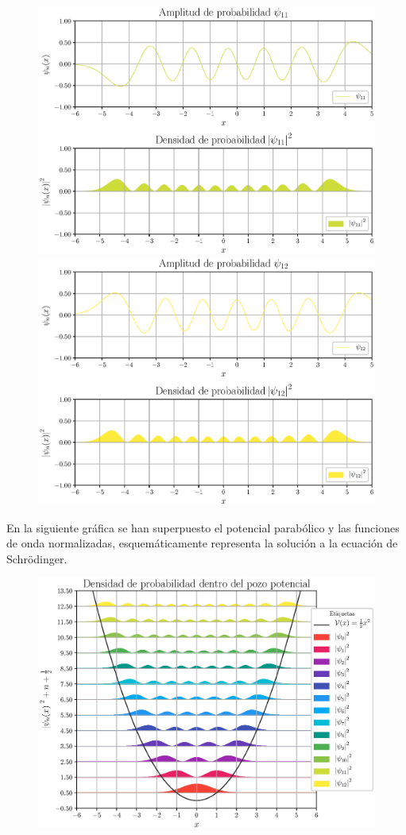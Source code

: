 \begin{figure}[H]
    \centering
    \includegraphics[scale=0.6]{Imagenes/Funcion_Onda_011.eps}
    \includegraphics[scale=0.6]{Imagenes/Funcion_Onda_012.eps}
\end{figure}
\newpage
En la siguiente gráfica se han superpuesto el potencial parabólico y las funciones de onda normalizadas, esquemáticamente representa la solución a la ecuación de Schrödinger.
\begin{figure}[H]
    \centering
    \includegraphics[scale=0.75]{Imagenes/Funciones_Normalizadas_01.eps}
\end{figure}
